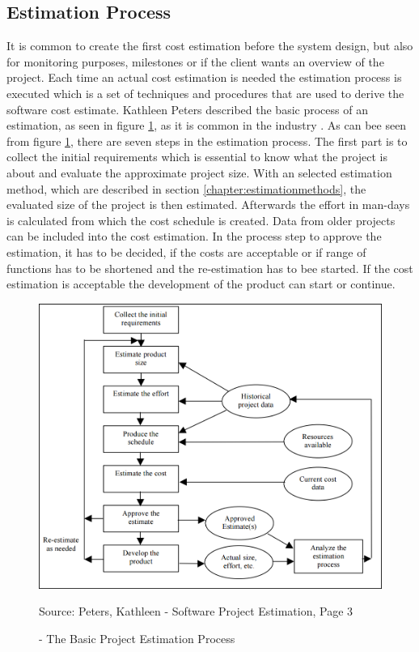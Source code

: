 \subsection{Estimation Process}

It is common to create the first cost estimation before the system design, but also for monitoring purposes, milestones or if the client wants an overview of the project. Each time an actual cost estimation is needed the estimation process is executed which is a set of techniques and procedures that are used to derive the software cost estimate. Kathleen Peters described the basic process of an estimation, as seen in figure \ref{fig:basicEstimationProcess}, as it is common in the industry \cite{estimationProcess}.
As can bee seen from figure \ref{fig:basicEstimationProcess}, there are seven steps in the estimation process. The first part is to collect the initial requirements which is essential to know what the project is about and evaluate the approximate project size. With an selected estimation method, which are described in section \ref{chapter:estimationmethods}, the evaluated size of the project is then estimated. Afterwards the effort in man-days is calculated from which the cost schedule is created. Data from older projects can be included into the cost estimation. In the process step to approve the estimation, it has to be decided, if the costs are acceptable or if range of functions has to be shortened and the re-estimation has to bee started. If the cost estimation is acceptable the development of the product can start or continue.\\
\begin{figure}[h] 
	\centering 
	\includegraphics[width=13cm]{images/estimationProcess.PNG} 
	\caption{- The Basic Project Estimation Process}
	Source: Peters, Kathleen - Software Project Estimation, Page 3  
	\label{fig:basicEstimationProcess}
\end{figure}\\
